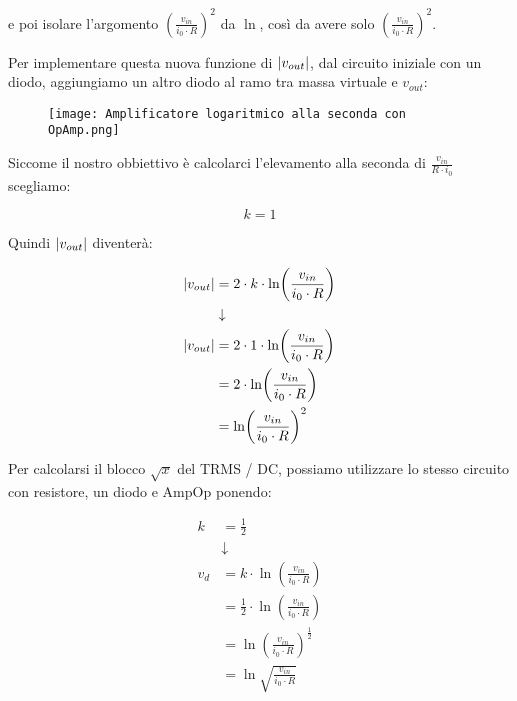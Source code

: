 e poi isolare l'argomento $(\frac{v_{in}}{i_0 \cdot R})^{2}$ da $\ln$, così da avere solo $(\frac{v_{in}}{i_0 \cdot R})^{2}$. \newline 

\newpage 

Per implementare questa nuova funzione di $\abs{v_{out}}$, dal circuito iniziale con un diodo, aggiungiamo un altro diodo al ramo tra massa virtuale e $v_{out}$: 

\begin{figure}[h]
    \centering
    \texttt{[image: Amplificatore logaritmico alla seconda con OpAmp.png]}
\end{figure}

Siccome il nostro obbiettivo è calcolarci l'elevamento alla seconda di $\frac{v_{in}}{R \cdot i_0}$ scegliamo: 

{
    \Large 
    \begin{equation}
        k = 1
    \end{equation}
}

Quindi $\abs{v_{out}}$ diventerà: 

{
    \Large 
    \begin{equation}
        \begin{split}
        \abs{v_{out}}
        &=  
        2 \cdot k \cdot \ln(\frac{v_{in}}{i_0 \cdot R})
        \\
        &\downarrow
        \\
        \abs{v_{out}}
        &=  
        2 \cdot 1 \cdot \ln(\frac{v_{in}}{i_0 \cdot R})
        \\
        &= 
        2 \cdot \ln(\frac{v_{in}}{i_0 \cdot R})
        \\
        &= 
        \ln(\frac{v_{in}}{i_0 \cdot R})^{2}
        \end{split}
    \end{equation}
}

Per calcolarsi il blocco $\sqrt{x}$ del TRMS / DC, 
possiamo utilizzare lo stesso circuito con resistore, un diodo e AmpOp ponendo: 

{
    \Large 
    \begin{equation}
        \begin{split}
            k &= \frac{1}{2}
            \\
            &\downarrow
            \\
            v_d &= k \cdot \ln(\frac{v_{in}}{i_0 \cdot R})
            \\
            &= 
            \frac{1}{2} \cdot \ln(\frac{v_{in}}{i_0 \cdot R})
            \\
            &= 
            \ln(\frac{v_{in}}{i_0 \cdot R})^{\frac{1}{2}}
            \\
            &= 
            \ln \sqrt{\frac{v_{in}}{i_0 \cdot R}}
        \end{split}
    \end{equation}
}


